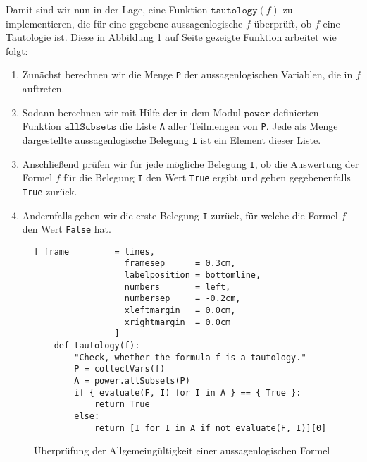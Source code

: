 Damit sind wir nun in der Lage, eine Funktion $\mathtt{tautology}(f)$ zu implementieren, die für eine gegebene
aussagenlogische $f$ überprüft, ob $f$ eine Tautologie ist.  Diese in Abbildung \ref{fig:tautology.py} auf Seite \pageref{fig:tautology.py}
gezeigte Funktion arbeitet wie folgt:
\begin{enumerate}
\item Zunächst berechnen wir die Menge \texttt{P} der aussagenlogischen Variablen, die in $f$ auftreten.
\item Sodann berechnen wir mit Hilfe der in dem Modul $\mathtt{power}$ definierten Funktion
      $\mathtt{allSubsets}$ die Liste \texttt{A} aller Teilmengen von \texttt{P}.  Jede als Menge dargestellte
      aussagenlogische Belegung \texttt{I} ist ein Element dieser Liste.
\item Anschließend prüfen wir für j\underline{ede} mögliche Belegung \texttt{I}, ob die Auswertung der Formel $f$ für die
      Belegung \texttt{I} den Wert \texttt{True} ergibt und geben gegebenenfalls \texttt{True} zurück.
\item Andernfalls geben wir die erste Belegung \texttt{I} zurück, für welche die Formel $f$ den Wert
      \texttt{False} hat.
\end{enumerate}

\begin{figure}[!ht]
  \centering
\begin{Verbatim}[ frame         = lines, 
                  framesep      = 0.3cm, 
                  labelposition = bottomline,
                  numbers       = left,
                  numbersep     = -0.2cm,
                  xleftmargin   = 0.0cm,
                  xrightmargin  = 0.0cm
                ]
    def tautology(f):
        "Check, whether the formula f is a tautology."
        P = collectVars(f)
        A = power.allSubsets(P)
        if { evaluate(F, I) for I in A } == { True }:
            return True
        else:
            return [I for I in A if not evaluate(F, I)][0]
\end{Verbatim}
\vspace*{-0.3cm}
  \caption{Überprüfung der Allgemeingültigkeit einer aussagenlogischen Formel}
  \label{fig:tautology.py}
\end{figure}

